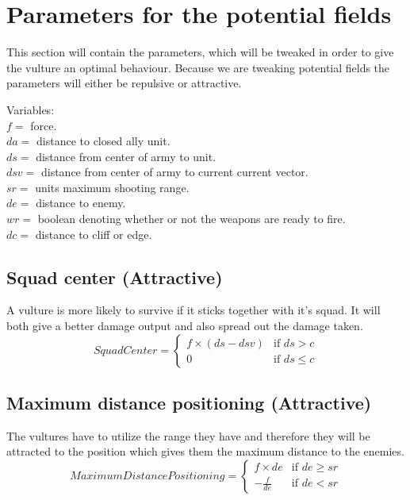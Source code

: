 \section{Parameters for the potential fields}
	This section will contain the parameters, which will be tweaked in order to give the vulture an optimal behaviour. Because we are tweaking 
	potential fields the parameters will either be repulsive or attractive.
	
	Variables:\\
	$f =$ force.\\
	$da =$ distance to closed ally unit.\\
	$ds =$ distance from center of army to unit.\\
	$dsv =$ distance from center of army to current current vector.\\
	$sr =$ units maximum shooting range.\\
	$de =$ distance to enemy.\\
	$wr =$ boolean denoting whether or not the weapons are ready to fire.\\
	$dc =$ distance to cliff or edge.
	
	\subsection*{Squad center (Attractive)}
		A vulture is more likely to survive if it sticks together with it's squad. It will both give a better damage output and also spread out the 
		damage taken.
		\begin{displaymath}
			SquadCenter  = \begin{cases}
					f \times (ds - dsv) & \text{if } ds > c\\
					0 & \text{if } ds \leq c
				\end{cases}		
		\end{displaymath}
		
		
	\subsection*{Maximum distance positioning (Attractive)}
		The vultures have to utilize the range they have and therefore they will be attracted to the position which gives them the maximum distance 
		to the enemies.
		\begin{displaymath}
			MaximumDistancePositioning = \begin{cases}
					f \times de & \text{if } de \geq sr\\
					- \frac{f}{de} & \text{if } de < sr
				\end{cases}		
		\end{displaymath}
